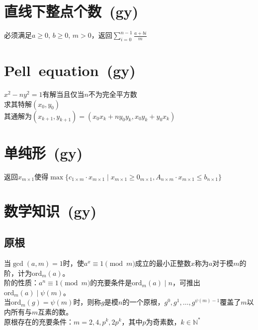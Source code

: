 \section{直线下整点个数\ \small(gy)}
	必须满足$ a \geq 0 $, $ b \geq 0 $, $ m > 0 $，返回$ \sum\limits_{i=0}^{n-1} \frac{a + bi}{m} $
\section{Pell\ equation\ \small(gy)}
	$ x^2 - n y^2 = 1 $有解当且仅当$ n $不为完全平方数
	\\求其特解$ (x_0, y_0) $
	\\其通解为$ (x_{k + 1}, y_{k + 1}) = (x_0 x_k + n y_0 y_k, x_0 y_k + y_0 x_k ) $
\section{单纯形\ \small(gy)}
	返回$ x_{m \times 1} $使得$ \max \lbrace c_{1 \times m} \cdot x_{m \times 1} \mid x_{m \times 1} \geq 0_{m \times 1}, A_{n \times m} \cdot x_{m \times 1} \leq b_{n \times 1} \rbrace $
\section{数学知识\ \small(gy)}
\newcommand{\eularian}{\genfrac\langle\rangle{0pt}{2}}
\newcommand{\Eularian}{\genfrac{\langle\!\langle}{\rangle\!\rangle}{0pt}{2}}
	\subsection*{原根}
		当$ \gcd(a, m) = 1 $时，使$ a^x \equiv 1 \pmod m $成立的最小正整数$ x $称为$ a $对于模$ m $的阶，计为$ \text{ord}_m(a) $。
		\\阶的性质：$ a^n \equiv 1 \pmod m $的充要条件是$ \text{ord}_m(a) \mid n $，可推出$ \text{ord}_m(a) \mid \psi(m) $。
		\\当$ \text{ord}_m(g) = \psi(m) $时，则称$ g $是模$ n $的一个原根，$ g^0, g^1, \dots, g^{\psi(m) - 1} $覆盖了$ m $以内所有与$ m $互素的数。
		\\原根存在的充要条件：$ m = 2, 4, p^k, 2 p^k $，其中$ p $为奇素数，$ k \in \mathbb{N}^\ast $
